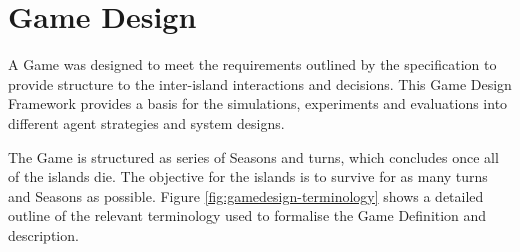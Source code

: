 \chapter{Game Design}

A Game was designed to meet the requirements outlined by the specification to provide structure to the inter-island interactions and decisions. This Game Design Framework provides a basis for the simulations, experiments and evaluations into different agent strategies and system designs.

The Game is structured as series of Seasons and turns, which concludes once all of the islands die. The objective for the islands is to survive for as many turns and Seasons as possible. Figure \ref{fig:gamedesign-terminology} shows a detailed outline of the relevant terminology used to formalise the Game Definition and description.


